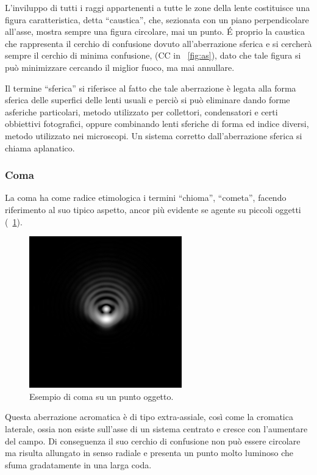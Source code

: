 L'inviluppo di tutti i raggi appartenenti a tutte le zone della lente costituisce una figura caratteristica, detta ``caustica'', che, sezionata con un piano perpendicolare all'asse, mostra sempre una figura circolare, mai un punto.
\'E proprio la caustica che rappresenta il cerchio di confusione dovuto all'aberrazione sferica e si cercherà sempre il cerchio di minima confusione, (CC in \figurename~\ref{fig:as}), dato che tale figura si può minimizzare cercando il miglior fuoco, ma mai annullare.

Il termine ``sferica'' si riferisce al fatto che tale aberrazione è legata alla forma sferica delle superfici delle lenti usuali e perciò si può eliminare dando forme asferiche particolari, metodo utilizzato per collettori, condensatori e certi obbiettivi fotografici, oppure combinando lenti sferiche di forma ed indice diversi, metodo utilizzato nei microscopi. 
Un sistema corretto dall'aberrazione sferica si chiama aplanatico.

\subsubsection*{Coma}
La coma ha come radice etimologica i termini ``chioma'', ``cometa'', facendo riferimento al suo tipico aspetto, ancor più evidente se agente su piccoli oggetti (\figurename~\ref{fig:coma}).

\begin{figure}
 \centering
 \includegraphics[scale=.50]{img/CAP2coma.jpg}
 \caption{\small{Esempio di coma su un punto oggetto.}}
 \label{fig:coma}
\end{figure}

Questa aberrazione acromatica è di tipo extra-assiale, così come la cromatica laterale, ossia non esiste sull'asse di un sistema centrato e cresce con l'aumentare del campo. 
Di conseguenza il suo cerchio di confusione non può essere circolare ma risulta allungato in senso radiale e presenta un punto molto luminoso che sfuma gradatamente in una larga coda. 

